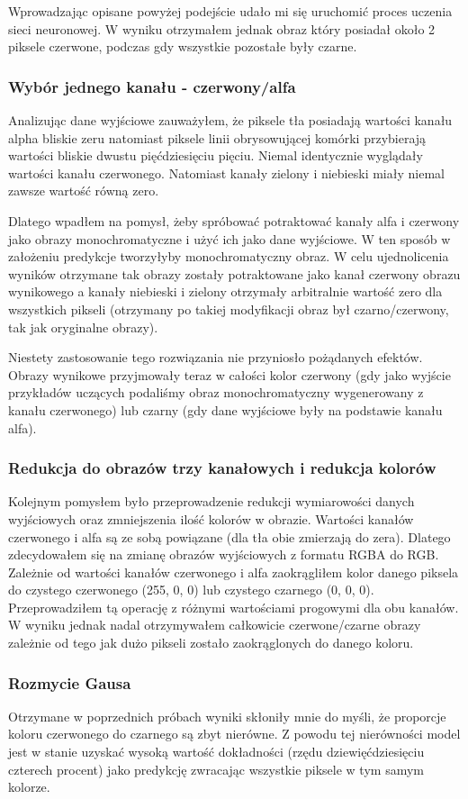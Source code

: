 \documentclass{article}
\begin{document}
Wprowadzając opisane powyżej podejście udało mi się uruchomić proces uczenia sieci neuronowej.
W wyniku otrzymałem jednak obraz który posiadał około 2 piksele czerwone, podczas gdy wszystkie pozostałe były czarne.
\subsubsection{Wybór jednego kanału - czerwony/alfa}
Analizując dane wyjściowe zauważyłem, że piksele tła posiadają wartości kanału alpha bliskie zeru natomiast piksele linii obrysowującej komórki przybierają wartości bliskie dwustu pięćdziesięciu pięciu.
Niemal identycznie wyglądały wartości kanału czerwonego.
Natomiast kanały zielony i niebieski miały niemal zawsze wartość równą zero.

Dlatego wpadłem na pomysł, żeby spróbować potraktować kanały alfa i czerwony jako obrazy monochromatyczne i użyć ich jako dane wyjściowe.
W ten sposób w założeniu predykcje tworzyłyby monochromatyczny obraz. W celu ujednolicenia wyników otrzymane tak obrazy zostały potraktowane jako kanał czerwony obrazu wynikowego a kanały niebieski i zielony otrzymały arbitralnie wartość zero dla wszystkich pikseli (otrzymany po takiej modyfikacji obraz był czarno/czerwony, tak jak oryginalne obrazy).

Niestety zastosowanie tego rozwiązania nie przyniosło pożądanych efektów.
Obrazy wynikowe przyjmowały teraz w całości kolor czerwony (gdy jako wyjście przykładów uczących podaliśmy obraz monochromatyczny wygenerowany z kanału czerwonego) lub
czarny (gdy dane wyjściowe były na podstawie kanału alfa).
\subsubsection{Redukcja do obrazów trzy kanałowych i redukcja kolorów}
Kolejnym pomysłem było przeprowadzenie redukcji wymiarowości danych wyjściowych oraz zmniejszenia ilość kolorów w obrazie.
Wartości kanałów czerwonego i alfa są ze sobą powiązane (dla tła obie zmierzają do zera).
Dlatego zdecydowałem się na zmianę obrazów wyjściowych z formatu RGBA do RGB.
Zależnie od wartości kanałów czerwonego i alfa zaokrągliłem kolor danego piksela do czystego czerwonego (255, 0, 0) lub czystego czarnego (0, 0, 0).
Przeprowadziłem tą operację z różnymi wartościami progowymi dla obu kanałów.
W wyniku jednak nadal otrzymywałem całkowicie czerwone/czarne obrazy zależnie od tego jak dużo pikseli zostało zaokrąglonych do danego koloru.
\subsubsection{Rozmycie Gausa}
Otrzymane w poprzednich próbach wyniki skłoniły mnie do myśli, że proporcje koloru czerwonego do czarnego są zbyt nierówne.
Z powodu tej nierówności model jest w stanie uzyskać wysoką wartość dokładności (rzędu dziewięćdziesięciu czterech procent) jako predykcję zwracając wszystkie piksele w tym samym kolorze.
\end{document}

